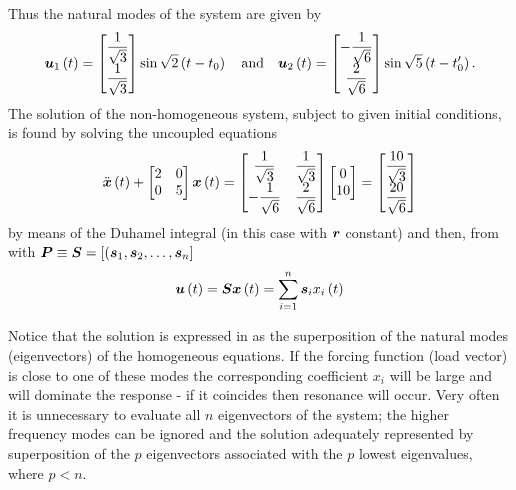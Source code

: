Thus the natural modes of the system are given by
\begin{displaymath}
 \fnof{\vect{u}_{1}}{t} = \begin{bmatrix}
   \dfrac{1}{\sqrt{3}}\\
   \dfrac{1}{\sqrt{3}}
 \end{bmatrix}
 \sin \sqrt{2}\pbrac{t-t_{0}}\quad \text{and} \quad
 \fnof{\vect{u}_{2}}{t} = \begin{bmatrix}
   -\dfrac{1}{\sqrt{6}} \\
   \dfrac{2}{\sqrt{6}}
 \end{bmatrix} \sin \sqrt{5}\pbrac{t-t'_{0}}.
\end{displaymath}      
The solution of the non-homogeneous system, subject to given initial
conditions, is found by solving the uncoupled equations
\begin{displaymath}
 \fnof{\ddot{\vect{x}}}{t} + \begin{bmatrix}
   2 & 0 \\
   0 & 5
 \end{bmatrix} \fnof{\vect{x}}{t} = \begin{bmatrix}
   \dfrac{1}{\sqrt{3}} & \dfrac{1}{\sqrt{3}} \\
   -\dfrac{1}{\sqrt{6}} & \dfrac{2}{\sqrt{6}}
 \end{bmatrix}\begin{bmatrix}
   0 \\
   10
 \end{bmatrix} = \begin{bmatrix}
   \dfrac{10}{\sqrt{3}}\\
   \dfrac{20}{\sqrt{6}}
 \end{bmatrix} 
\end{displaymath}
by means of the Duhamel integral  (in this case with $\vect{r}$
constant) and then, from  with
$\matr{P} \equiv \matr{S} = [(\vect{s}_{1}, \vect{s}_{2}, \ldots ,\vect{s}_{n}]$
\begin{equation}
  \fnof{\vect{u}}{t} = \matr{S}\fnof{\vect{x}}{t} = \dsuml{i=1}{n}
  \vect{s}_{i}\fnof{x_{i}}{t} 
  \label{eqn:Duhint}
\end{equation}

Notice that the solution is expressed in  as the superposition
of the natural modes (eigenvectors) of the homogeneous equations. If the
forcing function (load vector) is close to one of these modes the
corresponding coefficient $x_{i}$ will be large and will dominate the response
- if it coincides then resonance will occur. Very often it is unnecessary to
evaluate all $n$ eigenvectors of the system; the higher frequency modes can be
ignored and the solution adequately represented by superposition of the $p$
eigenvectors associated with the $p$ lowest eigenvalues, where $p<n$.

